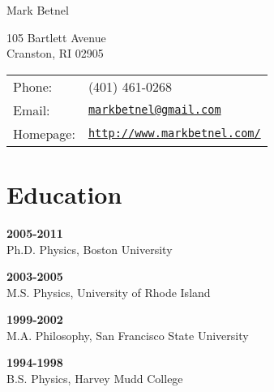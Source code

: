 \documentclass[letterpaper]{article}
\def\name{Mark Betnel}
\renewenvironment{itemize}{
  \begin{list}{}{
    \setlength{\leftmargin}{1.5em}
  }
}{
  \end{list}
}
\begin{document}
{\huge \name}


\vspace{0.25in}

\begin{minipage}{0.45\linewidth}
  105 Bartlett Avenue \\
  Cranston, RI 02905
  \end{minipage}
\begin{minipage}{0.45\linewidth}
  \begin{tabular}{ll}
    Phone: & (401) 461-0268 \\
    Email: & \href{mailto:markbetnel@gmail.com}{\tt markbetnel@gmail.com} \\
    Homepage: & \href{http://www.markbetnel.com/}{\tt http://www.markbetnel.com/} \\
  \end{tabular}
\end{minipage}




\section*{Education}
\begin{itemize}
  \item \textbf{2005-2011} \\
      Ph.D. 	Physics, 	Boston University
  \item 	\textbf{2003-2005} \\
	  M.S. 	Physics, University of Rhode Island 
  \item     \textbf{1999-2002} \\
      M.A. Philosophy, San Francisco State University 
  \item     \textbf{1994-1998} \\
	  B.S. Physics, Harvey Mudd College
\end{itemize}
\end{document}
